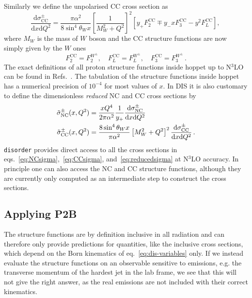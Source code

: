 \documentclass[submission, PhysCodeb]{SciPost}
\newcommand{\hoppet}{{\sc hoppet}}
\newcommand{\disorder}{{\tt disorder}}
\newcommand{\dd}{\mathrm{d}}
\newcommand{\NC}{\mathrm{NC}}
\newcommand{\CC}{\mathrm{CC}}
\newcommand{\NNNLO}{N$^3$LO}
\begin{document}
Similarly we define the unpolarised CC cross section as
\begin{equation}
\frac{\dd\sigma_{\CC}^\pm}{\dd x \dd Q^2} =   \frac{\pi\alpha^2}{8\sin^4\theta_W x}\left[\frac{1}{M_W^2 + Q^2}\right]^2 \left[y_+ F_2^{\CC} \mp y_- x F_3^\CC - y^2 F_L^\CC\right],\,
\label{eq:CCsigma}
\end{equation}
where $M_W$ is the mass of $W$ boson and the CC structure functions
are now simply given by the $W$ ones
\begin{equation}
  F_2^\CC = F_2^{W^\pm}, \quad   F_L^\CC = F_L^{W^\pm}, \quad   F_3^\CC = F_3^{W^\pm}\,.
\end{equation}
The exact definitions of all proton structure functions inside
\hoppet{} up to \NNNLO{} can be found in
Refs.~\cite{Salam:2008qg,BertoneKarlberg}. The tabulation of the
structure functions inside \hoppet{} has a numerical precision of
$10^{-4}$ for most values of $x$. In DIS it is also customary to
define the dimensionless \emph{reduced} NC and CC cross sections
by~\cite{H1:2012qti}
\begin{align}
  \label{eq:reducedsigma}
  \tilde{\sigma}_\NC^\pm(x,Q^2) &= \frac{xQ^4}{2\pi\alpha^2}\frac{1}{y_+}\frac{\dd\sigma_{\NC}^\pm}{\dd x \dd Q^2} \\ \notag
  \tilde{\sigma}_\CC^\pm(x,Q^2) &= \frac{8\sin^4\theta_W x}{\pi\alpha^2}\left[M_W^2+Q^2\right]^2\frac{\dd\sigma_{\CC}^\pm}{\dd x \dd Q^2}\,.
\end{align}
\disorder{} provides direct access to all the cross sections in
eqs.~\eqref{eq:NCsigma},~\eqref{eq:CCsigma},
and~\eqref{eq:reducedsigma} at \NNNLO{} accuracy. In principle one can
also access the NC and CC structure functions, although they are
currently only computed as an intermediate step to construct the cross
sections.

\subsection{Applying P2B}
\label{sec:P2B}
The structure functions are by definition inclusive in all radiation
and can therefore only provide predictions for quantities, like the
inclusive cross sections, which depend on the Born kinematics of
eq.~\eqref{eq:dis-variables} only. If we instead evaluate the
structure functions on an observable sensitive to emissions, e.g. the
transverse momentum of the hardest jet in the lab frame, we see that
this will not give the right answer, as the real emissions are not
included with their correct kinematics. 
\end{document}
